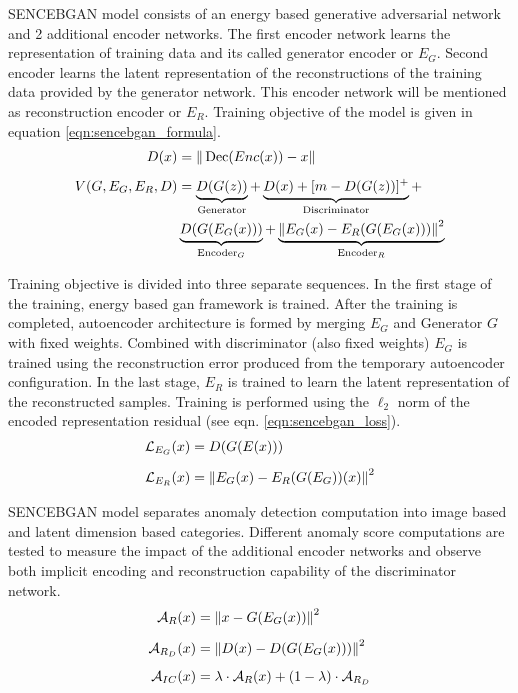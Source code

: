 SENCEBGAN model consists of an energy based generative adversarial network and 2 additional encoder networks. The first encoder network 
learns the representation of training data and its called generator encoder or $E_{G}$. Second encoder learns the latent representation 
of the reconstructions of the training data provided by the generator network. This encoder network will be mentioned as reconstruction 
encoder or $E_{R}$. Training objective of the model is given in equation \ref{eqn:sencebgan_formula}.
\begin{equation}
	\begin{aligned}
		D(x)&=\|\operatorname{Dec}(E n c(x))-x\|\\[5pt]
		V(G,E_{G},E_{R}, D) &= \underbrace{D(G(z))}_{\text{Generator}} + \underbrace{D(x)+[m-D(G(z))]^{+}}_{\text{Discriminator}} +\\ & \underbrace{D(G(E_{G}(x)))}_{\text{Encoder}_{G}} + \underbrace{\left\lVert E_{G}(x) - E_{R}(G(E_{G}(x)))\right\rVert^2}_{\text{Encoder}_{R}}
	\end{aligned}
	\label{eqn:sencebgan_formula}
\end{equation}

Training objective is divided into three separate sequences. In the first stage of the training, energy based gan framework is trained. 
After the training is completed, autoencoder architecture is formed by merging $E_{G}$ and Generator $G$ with fixed weights. Combined with 
discriminator (also fixed weights) $E_{G}$ is trained using the reconstruction error produced from the temporary autoencoder configuration. 
In the last stage, $E_{R}$ is trained to learn the latent representation of the reconstructed samples. Training is performed using the $\ell_{2}$
norm of the encoded representation residual (see eqn. \ref{eqn:sencebgan_loss}). 
\begin{equation}
	\label{eqn:sencebgan_loss}
	\begin{aligned}
		\mathcal{L}_{E_{G}}(x) &= D(G(E(x))) \\[5pt]
		\mathcal{L}_{E_{R}}(x) &= \left\lVert E_{G}(x) - E_{R}(G(E_{G}))(x)\right\rVert^2
 	\end{aligned}
\end{equation}

SENCEBGAN model separates anomaly detection computation into image based and latent dimension based categories. Different anomaly score computations 
are tested to measure the impact of the additional encoder networks and observe both implicit encoding and reconstruction capability of the discriminator network. 
\begin{equation}
	\label{eqn:sencebgan_eqn_im}
	\begin{aligned}
	\mathcal{A}_{R}(x) & = \left\lVert x - G(E_{G}(x))\right\rVert^ 2 \\[5pt]
	\mathcal{A}_{R_{D}}(x) & = \left\lVert D(x) - D(G(E_{G}(x)))\right\rVert^2\\[5pt]
	\mathcal{A}_{IC}(x) & = \lambda \cdot \mathcal{A}_{R}(x) + (1 - \lambda) \cdot \mathcal{A}_{R_{D}}
	\end{aligned}
\end{equation}


